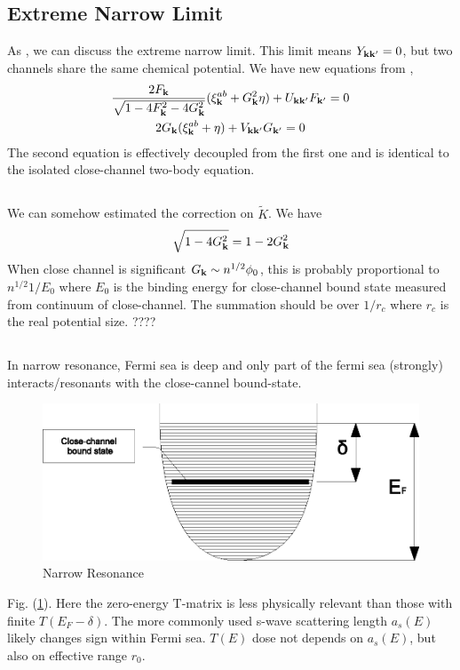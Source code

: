 \subsection{Extreme Narrow Limit}
As \cite{GurarieNarrow}, we can discuss the extreme narrow limit.  This limit means $Y_{\mathbf{k}\mathbf{k}'}=0$, but two channels share the same chemical potential.  We have new equations from ,
\begin{subequations}\label{eq:20100927:gapExtreme}
\begin{gather}\label{eq:20100927:gapa}
\frac{2F_{\mathbf{k}}}{\sqrt{1-4 F_{\mathbf{k}}^2-4 G_{\mathbf{k}}^2}} (\xi^{ab}_{\mathbf{k}}+  G_{\mathbf{k}}^2\eta)+U_{\mathbf{k}\mathbf{k}'}F_{\mathbf{k}'}=0\\
\label{eq:20100927:gapb}
{2G_{\ensuremath{\mathbf{k}}}}(\xi^{ab}_{\mathbf{k}}+\eta)+V_{\mathbf{k}\mathbf{k}'}G_{\mathbf{k}'}=0
\end{gather}
\end{subequations}
The second equation is effectively decoupled from the first one and is identical to the isolated close-channel two-body \sch equation. 

\subsection{}
We can somehow estimated the  correction on $\tilde{K}$.  We have 
\[\sqrt{1-4G_{\mathbf{k}}^{2}}=1-2G_{\mathbf{k}}^{2}\]
When close channel is significant $G_{\mathbf{k}}\sim{n^{1/2}\phi_{0}}$, this is probably proportional to $n^{1/2}1/E_{0}$ where $E_{0}$ is the binding energy for close-channel bound state measured from continuum of close-channel.  The summation should be over $1/r_{c}$ where $r_{c}$ is the real potential size.  ????

\subsection{}
In narrow resonance, Fermi sea is deep and only part of the fermi sea (strongly) interacts/resonants with the close-cannel bound-state.   
\begin{figure}[hhtb]
	\centering
		\includegraphics[width=.50\textwidth]{image/narrowFR.eps}
	\caption{Narrow Resonance\label{fig:narrowFR}}
\end{figure}
Fig. (\ref{fig:narrowFR}).  Here the zero-energy T-matrix is less  physically relevant than those with finite $T(E_{F}-\delta)$.  The more commonly used s-wave scattering length $a_{s}(E)$ likely changes sign within Fermi sea.  $T(E)$ dose not depends on $a_{s}(E)$, but also on effective range $r_{0}$.  

